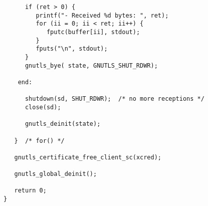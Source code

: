 \begin{verbatim}
      if (ret > 0) {
         printf("- Received %d bytes: ", ret);
         for (ii = 0; ii < ret; ii++) {
            fputc(buffer[ii], stdout);
         }
         fputs("\n", stdout);
      }
      gnutls_bye( state, GNUTLS_SHUT_RDWR);

    end:

      shutdown(sd, SHUT_RDWR);  /* no more receptions */
      close(sd);

      gnutls_deinit(state);

   }  /* for() */

   gnutls_certificate_free_client_sc(xcred);

   gnutls_global_deinit();

   return 0;
}

\end{verbatim}
